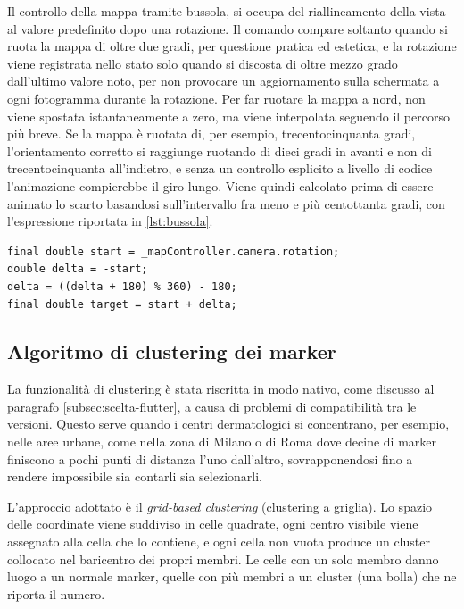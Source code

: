 Il controllo della mappa tramite bussola, si occupa del riallineamento della vista al valore predefinito dopo una rotazione.
Il comando compare soltanto quando si ruota la mappa di oltre due gradi, per questione pratica ed estetica,
e la rotazione viene registrata nello stato solo quando si discosta di oltre mezzo grado dall'ultimo valore noto, per
non provocare un aggiornamento sulla schermata a ogni fotogramma durante la rotazione.
Per far ruotare la mappa a nord, non viene spostata istantaneamente a zero, ma viene interpolata seguendo il percorso
più breve.
Se la mappa è ruotata di, per esempio, trecentocinquanta gradi, l'orientamento corretto si raggiunge ruotando di dieci gradi in avanti e non di
trecentocinquanta all'indietro, e senza un controllo esplicito a livello di codice l'animazione compierebbe il giro lungo.
Viene quindi calcolato prima di essere animato lo scarto basandosi sull'intervallo fra meno e più centottanta gradi, con l'espressione
riportata in \ref{lst:bussola}.

\begin{listing}[H]
\begin{verbatim}
final double start = _mapController.camera.rotation;
double delta = -start;
delta = ((delta + 180) % 360) - 180;
final double target = start + delta;
\end{verbatim}
\caption{Calcolo percorso più breve della bussola per puntare a nord.}
\label{lst:bussola}
\end{listing}


\subsection{Algoritmo di clustering dei marker}\label{subsec:impl-clustering}

La funzionalità di clustering è stata riscritta in modo nativo, come discusso al paragrafo \ref{subsec:scelta-flutter}, a causa di problemi di
compatibilità tra le versioni.
Questo serve quando i centri dermatologici si concentrano, per esempio, nelle aree urbane, come nella zona di Milano o
di Roma dove decine di marker finiscono a pochi punti di distanza l'uno dall'altro, sovrapponendosi fino a rendere impossibile
sia contarli sia selezionarli.

L'approccio adottato è il \textit{grid-based clustering} (clustering a griglia).
Lo spazio delle coordinate viene suddiviso in celle quadrate, ogni centro visibile viene assegnato alla cella che lo
contiene, e ogni cella non vuota produce un cluster collocato nel baricentro dei propri membri.
Le celle con un solo membro danno luogo a un normale marker, quelle con più membri a un cluster (una bolla) che ne riporta il numero.

